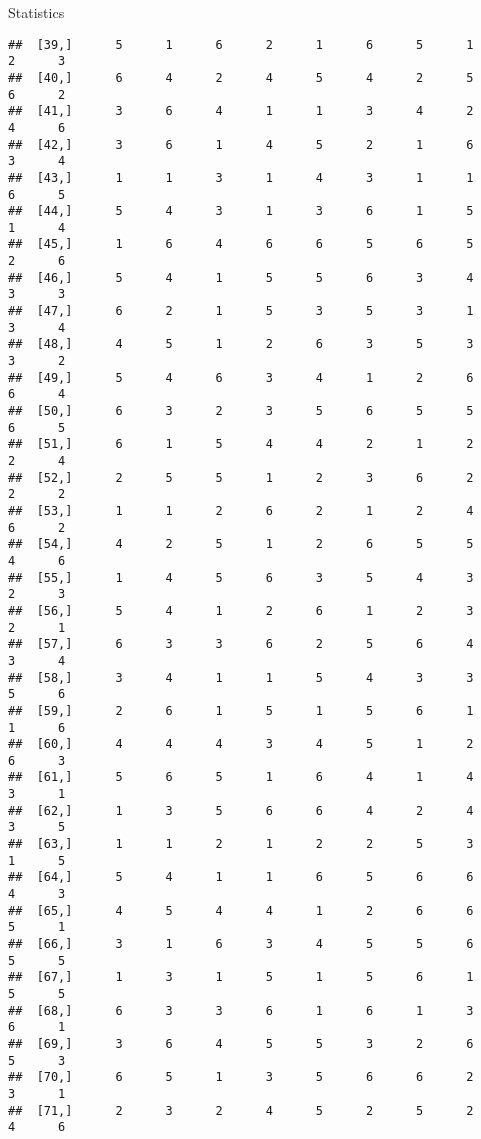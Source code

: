 \documentclass[
  ignorenonframetext,
]{beamer}
\begin{document}
\begin{frame}[fragile]{Statistics}
\begin{verbatim}
##  [39,]      5      1      6      2      1      6      5      1      2      3
##  [40,]      6      4      2      4      5      4      2      5      6      2
##  [41,]      3      6      4      1      1      3      4      2      4      6
##  [42,]      3      6      1      4      5      2      1      6      3      4
##  [43,]      1      1      3      1      4      3      1      1      6      5
##  [44,]      5      4      3      1      3      6      1      5      1      4
##  [45,]      1      6      4      6      6      5      6      5      2      6
##  [46,]      5      4      1      5      5      6      3      4      3      3
##  [47,]      6      2      1      5      3      5      3      1      3      4
##  [48,]      4      5      1      2      6      3      5      3      3      2
##  [49,]      5      4      6      3      4      1      2      6      6      4
##  [50,]      6      3      2      3      5      6      5      5      6      5
##  [51,]      6      1      5      4      4      2      1      2      2      4
##  [52,]      2      5      5      1      2      3      6      2      2      2
##  [53,]      1      1      2      6      2      1      2      4      6      2
##  [54,]      4      2      5      1      2      6      5      5      4      6
##  [55,]      1      4      5      6      3      5      4      3      2      3
##  [56,]      5      4      1      2      6      1      2      3      2      1
##  [57,]      6      3      3      6      2      5      6      4      3      4
##  [58,]      3      4      1      1      5      4      3      3      5      6
##  [59,]      2      6      1      5      1      5      6      1      1      6
##  [60,]      4      4      4      3      4      5      1      2      6      3
##  [61,]      5      6      5      1      6      4      1      4      3      1
##  [62,]      1      3      5      6      6      4      2      4      3      5
##  [63,]      1      1      2      1      2      2      5      3      1      5
##  [64,]      5      4      1      1      6      5      6      6      4      3
##  [65,]      4      5      4      4      1      2      6      6      5      1
##  [66,]      3      1      6      3      4      5      5      6      5      5
##  [67,]      1      3      1      5      1      5      6      1      5      5
##  [68,]      6      3      3      6      1      6      1      3      6      1
##  [69,]      3      6      4      5      5      3      2      6      5      3
##  [70,]      6      5      1      3      5      6      6      2      3      1
##  [71,]      2      3      2      4      5      2      5      2      4      6

\end{verbatim}
\end{frame}
\end{document}
